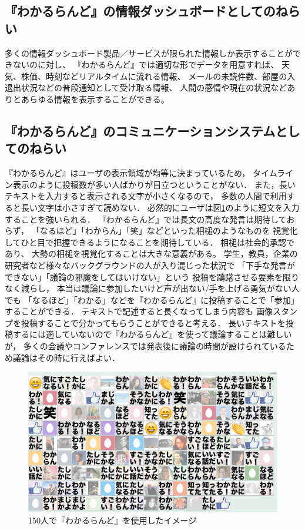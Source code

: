 \subsection{『わかるらんど』の情報ダッシュボードとしてのねらい}

多くの情報ダッシュボード製品／サービスが限られた情報しか表示することができないのに対し、
『わかるらんど』では適切な形でデータを用意すれば、
天気、株価、時刻などリアルタイムに流れる情報、
メールの未読件数、部屋の入退出状況などの普段通知として受け取る情報、
人間の感情や現在の状況などありとあらゆる情報を表示することができる。


\subsection{『わかるらんど』のコミュニケーションシステムとしてのねらい}
\label{nerai}

『わかるらんど』はユーザの表示領域が均等に決まっているため，
タイムライン表示のように投稿数が多い人ばかりが目立つということがない．
また，長いテキストを入力すると表示される文字が小さくなるので，
多数の人間で利用すると長い文字は小さすぎて読めない．
必然的にユーザは図\ref{wakaruland150}のように短文を入力することを強いられる．
『わかるらんど』では長文の高度な発言は期待しておらず，
「なるほど」「わからん」「笑」などといった相槌のようなものを
視覚化してひと目で把握できるようになることを期待している．
相槌は社会的承認であり\cite{130001611628}、
大勢の相槌を視覚化することは大きな意義がある。
学生，教員，企業の研究者など様々なバックグラウンドの人が入り混じった状況で
「下手な発言ができない」「議論の邪魔をしてはいけない」という
投稿を躊躇させる要素を限りなく減らし，
本当は議論に参加したいけど声が出ない/手を上げる勇気がない人でも
「なるほど」「わかる」などを『わかるらんど』に投稿することで「参加」することができる．
テキストで記述すると長くなってしまう内容も
画像スタンプを投稿することで分かってもらうことができると考える．
長いテキストを投稿するには適していないので『わかるらんど』を使って議論することは難しいが，
多くの会議やコンファレンスでは発表後に議論の時間が設けられているため議論はその時に行えばよい．

\begin{figure}[H]
\centering
\includegraphics[width=12cm]{images/wakaruland150.png}
\caption{150人で『わかるらんど』を使用したイメージ}
\label{wakaruland150}
\end{figure}